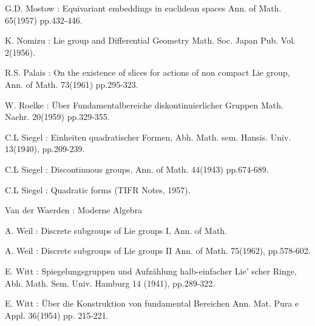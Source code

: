 \begin{thebibliography}{99}
 {G.D. Mostow} : Equivariant embeddings in euclidean spaces
  Ann. of Math. 65(1957) pp.432-446. 

 {K. Nomizu} : Lie group and Differential Geometry
  Math. Soc. Japan Pub. Vol. 2(1956). 

 {R.S. Palais} : On the existence of slices for actions of non
  compact Lie group, Ann. of Math. 73(1961) pp.295-323. 

 {W. Roelke} : \"Uber Fundamentalbereiche diskontinuierlicher
  Gruppen Math. Nachr. 20(1959) pp.329-355. 

 {C.L Siegel} : Einheiten quadratischer Formen,
  Abh. Math. sem. Hansis. Univ. 13(1940), pp.209-239. 

 {C.L Siegel} : Discontinuous groups, Ann. of
  Math. 44(1943) pp.674-689. 

 {C.L Siegel} : Quadratic forms (TIFR Notes, 1957).  

 {Van der Waerden} : Moderne Algebra

 {A. Weil} : Discrete subgroups of Lie groups I, Ann. of Math.

 {A. Weil} : Discrete subgroups of Lie groups II Ann. of
  Math. 75(1962), pp.578-602. 

 {E. Witt} : Spiegelungsgruppen und Aufz\"ahlung halb-einfacher
  Lie' scher Ringe, Abh. Math. Sem. Univ. Hamburg 14
  (1941), pp.289-322. 

 {E. Witt} : \"Uber die Konstruktion von fundamental Bereichen
  Ann. Mat. Pura e Appl. 36(1954) pp. 215-221.      
\end{thebibliography}
